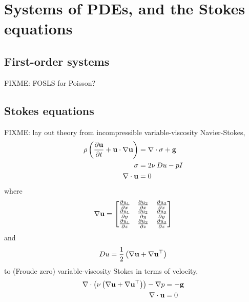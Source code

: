 
\chapter{Systems of PDEs, and the Stokes equations}
\label{chap:stokes}

\section{First-order systems}

FIXME: FOSLS for Poisson?

\section{Stokes equations}

FIXME: lay out theory from incompressible variable-viscosity Navier-Stokes,
\begin{align*}
\rho \left(\frac{\partial \mathbf{u}}{\partial t} + \mathbf{u} \cdot \nabla \mathbf{u}\right) &= \nabla\cdot \sigma + \mathbf{g} \\
\sigma &= 2 \nu\, Du - p I \\
\nabla\cdot \mathbf{u} &= 0
\end{align*}
where
  $$\nabla \mathbf{u} = \begin{bmatrix}
    \frac{\partial u_1}{\partial x} & \frac{\partial u_2}{\partial x} & \frac{\partial u_3}{\partial x} \\
    \frac{\partial u_1}{\partial y} & \frac{\partial u_2}{\partial y} & \frac{\partial u_3}{\partial y} \\
    \frac{\partial u_1}{\partial z} & \frac{\partial u_2}{\partial z} & \frac{\partial u_3}{\partial z}
    \end{bmatrix}$$
and
    $$D u = \frac{1}{2} \left(\nabla \mathbf{u} + \nabla \mathbf{u}^{\top}\right)$$
to (Froude zero) variable-viscosity Stokes in terms of velocity,
\begin{align*}
\nabla\cdot \left(\nu \left(\nabla \mathbf{u} + \nabla \mathbf{u}^{\top}\right)\right) - \nabla p &= - \mathbf{g} \\
\nabla\cdot \mathbf{u} &= 0
\end{align*}

